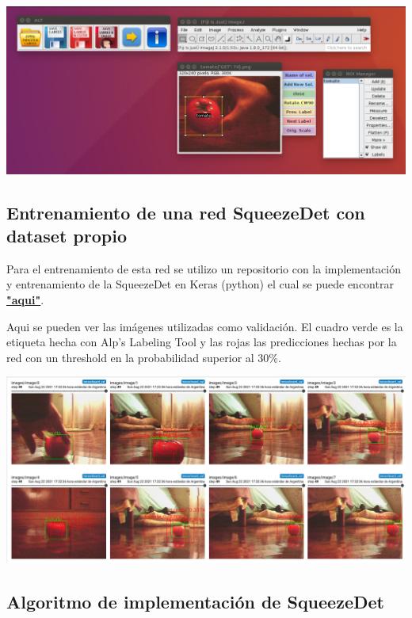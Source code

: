 \begin{center}
    \includegraphics[scale=0.3]{Tesis/Capitulos/03_CAPITULO_1/img/etiquetas.png}
\end{center}

\subsection{Entrenamiento de una red SqueezeDet con dataset propio}

Para el entrenamiento de esta red se utilizo un repositorio con la implementación y entrenamiento de la SqueezeDet en Keras (python) el cual se puede encontrar \href{https://github.com/omni-us/squeezedet-keras}{\textbf{"aqui"}}.

Aqui se pueden ver las imágenes utilizadas como validación. El cuadro verde es la etiqueta hecha con Alp’s Labeling Tool y las rojas las predicciones hechas por la red con un threshold en la probabilidad superior al 30\%.

\begin{center}
    \includegraphics[scale=0.3]{Tesis/Capitulos/03_CAPITULO_1/img/tomate_250_im.png}
\end{center}

\subsection{Algoritmo de implementación de  SqueezeDet}

